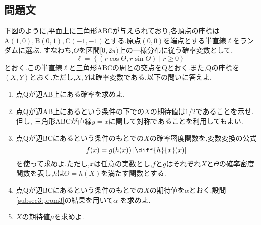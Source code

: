\documentclass[dvipdfmx,titlepage, 11pt, a4paper]{jsarticle}%
\begin{document}
\newpage

\section{}%
\subsection{問題文}
下図のように,平面上に三角形$\mathrm{ABC}$が与えられており,各頂点の座標は
$\mathrm{A(1, 0), B(0, 1), C(-1, -1)}$とする.原点$(0, 0)$を端点とする半直線$\ell$をランダムに選ぶ.
すなわち,$\Theta$を区間$[0, 2\pi)$上の一様分布に従う確率変数として,
\begin{equation*}
    \ell = \left\{(r\cos\Theta, r\sin\Theta) \mid r \geq 0\right\}
\end{equation*}
とおく.この半直線$\ell$と三角形$\mathrm{ABC}$の周との交点を$\mathrm{Q}$とおく.また,$\mathrm{Q}$の座標を
$(X, Y)$とおく.ただし,$X, Y$は確率変数である.以下の問いに答えよ.
\begin{enumerate}[(1)]
    \setlength{\itemsep}{10pt}
    \item 点$\mathrm{Q}$が辺$\mathrm{AB}$上にある確率を求めよ.\label{subsec3:prom1}
    \item 点$\mathrm{Q}$が辺$\mathrm{AB}$上にあるという条件の下での$X$の期待値は$1/2$であることを示せ.但し,
    三角形$\mathrm{ABC}$が直線$y = x$に関して対称であることを利用してもよい.\label{subsec3:prom2}
    \item 点$\mathrm{Q}$が辺$\mathrm{BC}$にあるという条件のもとでの$X$の確率密度関数を,変数変換の公式
    \begin{equation*}
        f(x) = g(h(x))\left\lvert \diff{h}{x}(x) \right\rvert
    \end{equation*}
    を使って求めよ.ただし,$x$は任意の実数とし,$f$と$g$はそれぞれ$X$と$\Theta$の確率密度関数を表し,$h$は$\Theta = h(X)$を満たす関数とする.\label{subsec3:prom3}
    \item 点$\mathrm{Q}$が辺$\mathrm{BC}$にあるという条件のもとでの$X$の期待値を$\alpha$とおく.設問\ref{subsec3:prom3}の結果を用いて$\alpha$
    を求めよ.\label{subsec3:prom4}
    \item $X$の期待値$\mu$を求めよ.
\end{enumerate}
\begin{figure}[htbp]
    \centering
\end{figure}
\end{document}

